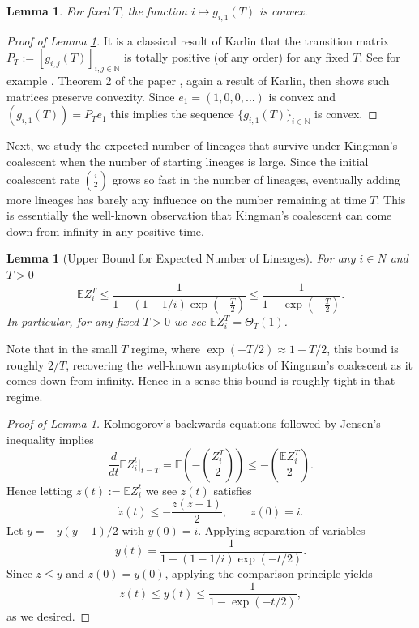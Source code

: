 \documentclass[10pt,oneside,reqno]{article}
\theoremstyle{plain}
\newtheorem{lemma}[theorem]{Lemma}
\theoremstyle{definition}
\numberwithin{equation}{section}
\renewcommand{\cite}{\citep}
\renewcommand{\leq}{\leqslant}
\newcommand{\N}{\mathbb{N}}
\newcommand{\E}{\mathbb{E}}
\begin{document}
    \begin{lemma}
        For fixed $T$, the function $i \mapsto g_{i,1}(T)$ is convex.
        \label{lem:g_i1_is_convex}
    \end{lemma}

    \begin{proof}[Proof of Lemma \ref{lem:g_i1_is_convex}]
      It is a classical result of Karlin that the transition matrix $P_T := [g_{i,j}(T)]_{i,j\in \N}$ is totally positive (of any order) for any fixed $T$. See for example \cite{karlin1959coincidence}. Theorem 2 of the paper \cite{eppen1966convexity}, again a result of Karlin, then shows such matrices preserve convexity. Since $e_1 = (1,0,0,...)$ is convex and $(g_{i,1}(T)) = P_T e_1$ this implies the sequence $\{g_{i,1}(T)\}_{i \in \N}$ is convex. 
    \end{proof}


    \noindent Next, we study the expected number of lineages that survive under Kingman's coalescent when the number of starting lineages is large. Since the initial coalescent rate ${i\choose 2}$ grows so fast in the number of lineages, eventually adding more lineages has barely any influence on the number remaining at time $T$. This is essentially the well-known observation that Kingman's coalescent can come down from infinity in any positive time. 

    \begin{lemma}[Upper Bound for Expected Number of Lineages]
        For any $i \in N$ and $T > 0$
            \[\E Z_i^T \leq \frac{1}{1-(1-1/i)\exp(-\frac{T}{2})} \leq\frac{1}{1-\exp\left(-\frac{T}{2}\right)}.\]
        In particular, for any fixed $T > 0$ we see $\E Z_i^T = \Theta_T(1)$.
        \label{lem:expected_number_lineages}
    \end{lemma}

    \noindent Note that in the small $T$ regime, where $\exp(-T/2) \approx 1-T/2$, this bound is roughly $2/T$, recovering the well-known asymptotics of Kingman's coalescent as it comes down from infinity. Hence in a sense this bound is roughly tight in that regime. 

    \begin{proof}[Proof of Lemma \ref{lem:expected_number_lineages}]
    Kolmogorov's backwards equations followed by Jensen's inequality implies
        \[\frac{d}{dt} \E Z_i^t \bigg \vert_{t=T} = \E \left(-{ Z_i^T \choose 2} \right) \leq -{ \E Z_i^T \choose 2}.  \]
    \noindent Hence letting $z(t) := \E Z^t_i$ we see $z(t)$ satisfies
        \[\dot{z}(t) \leq -\frac{z(z-1)}{2}, \qquad z(0) = i.\]
    \noindent Let $\dot{y} = - y(y-1)/2$ with $y(0) = i$. Applying separation of variables
    \[y(t) = \frac{1}{1-\left(1-1/i\right) \exp(-t/2)}.\]
    \noindent Since $\dot{z} \leq \dot{y}$ and $z(0) = y(0)$, applying the comparison principle yields
    \[z(t) \leq y(t) \leq \frac{1}{1- \exp(-t/2)},\]
    \noindent as we desired.
    \end{proof}
\end{document}
